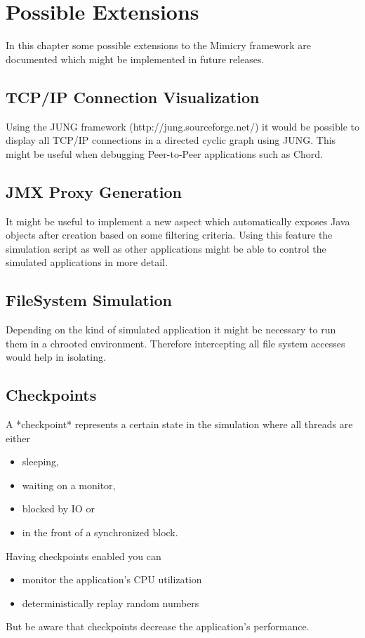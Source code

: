 \documentclass[a4paper,oneside]{book}
\begin{document}
\chapter{Possible Extensions}
In this chapter some possible extensions to the Mimicry framework are documented which might be implemented in future releases.

\section{TCP/IP Connection Visualization}
Using the JUNG framework (http://jung.sourceforge.net/) it would be possible to display all TCP/IP connections in a directed cyclic graph using JUNG. This might be useful when debugging Peer-to-Peer applications such as Chord.

\section{JMX Proxy Generation}
It might be useful to implement a new aspect which automatically exposes Java objects after creation based on some filtering criteria. Using this feature the simulation script as well as other applications might be able to control the simulated applications in more detail.

\section{FileSystem Simulation}
Depending on the kind of simulated application it might be necessary to run them in a chrooted environment. Therefore intercepting all file system accesses would help in isolating.

\section{Checkpoints}
A *checkpoint* represents a certain state in the simulation where all threads are either
\begin{itemize}
	\item sleeping,
	\item waiting on a monitor,
	\item blocked by IO or
	\item in the front of a synchronized block.
\end{itemize}
Having checkpoints enabled you can
\begin{itemize}
	\item monitor the application's CPU utilization
	\item deterministically replay random numbers
\end{itemize}
But be aware that checkpoints decrease the application's performance.




\end{document}
